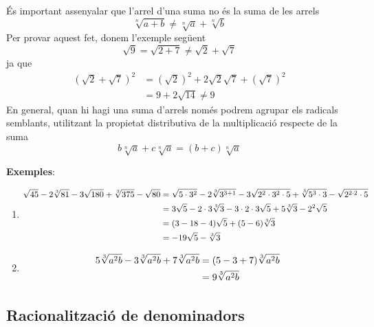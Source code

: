 És important assenyalar que l’arrel d’una suma no és la suma de les
arrels%
\begin{equation*}
\sqrt[n]{a+b}\neq \sqrt[n]{a}+\sqrt[n]{b}
\end{equation*}%
Per provar aquest fet, donem l’exemple següent%
\begin{equation*}
\sqrt{9}=\sqrt{2+7}\neq \sqrt{2}+\sqrt{7}
\end{equation*}%
ja que%
\begin{align*}
\left( \sqrt{2}+\sqrt{7}\right) ^{2} &=\left( \sqrt{2}\right) ^{2}+2\sqrt{2}%
\sqrt{7}+\left( \sqrt{7}\right) ^{2} \\
&=9+2\sqrt{14}\neq 9
\end{align*}%
En general, quan hi hagi una suma d’arrels només podrem
agrupar els radicals semblants, utilitzant la propietat distributiva de la
multiplicació respecte de la suma%
\begin{equation*}
b\sqrt[n]{a}+c\sqrt[n]{a}=(b+c)\sqrt[n]{a}
\end{equation*}

\textbf{Exemples}:

\begin{enumerate}
\item 
\begin{align*}
\sqrt{45}-2\sqrt[3]{81}-3\sqrt{180}+\sqrt[3]{375}-\sqrt{80} &=\sqrt{5\cdot
3^{2}}-2\sqrt[3]{3^{3+1}}-3\sqrt{2^{2}\cdot 3^{2}\cdot 5}+\sqrt[3]{%
5^{3}\cdot 3}-\sqrt{2^{2\cdot 2}\cdot 5} \\
&=3\sqrt{5}-2\cdot 3\sqrt[3]{3}-3\cdot 2\cdot 3\sqrt{5}+5\sqrt[3]{3}-2^{2}%
\sqrt{5} \\
&=(3-18-4)\sqrt{5}+(5-6)\sqrt[3]{3} \\
&=-19\sqrt{5}-\sqrt[3]{3}
\end{align*}

\item 
\begin{align*}
5\sqrt[3]{a^{2}b}-3\sqrt[3]{a^{2}b}+7\sqrt[3]{a^{2}b} &=(5-3+7)\sqrt[3]{%
a^{2}b} \\
&=9\sqrt[3]{a^{2}b}
\end{align*}
\end{enumerate}

\subsection{Racionalització de denominadors}

